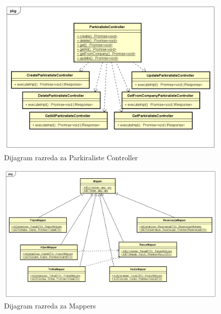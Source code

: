		\begin{figure}[H]
			\includegraphics[width=1\linewidth]{dijagrami/Dijagram razreda - ParkiralisteController.png}
			\caption{Dijagram razreda za Parkiraliste Controller}
			\label{fig:Dijagram razreda - ParkiralisteController} 
		\end{figure}
			
		\begin{figure}[H]
			\includegraphics[width=1\linewidth]{dijagrami/Dijagram razreda - Mappers.png}
			\caption{Dijagram razreda za Mappers}
			\label{fig:Dijagram razreda - Mappers} 
		\end{figure}
		
